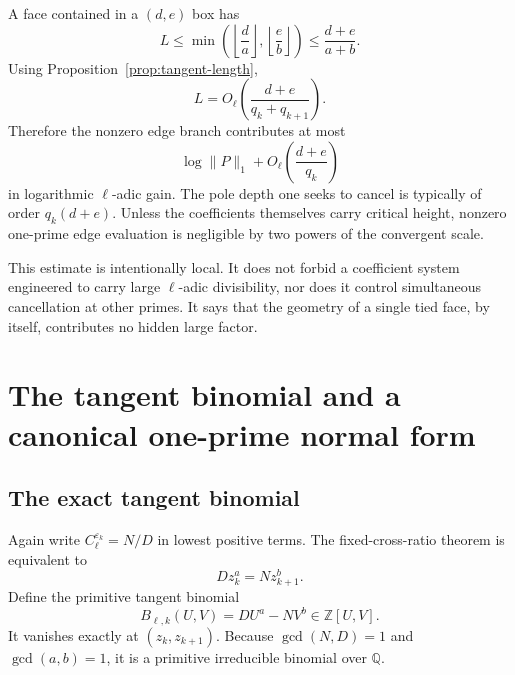 \documentclass[11pt,oneside]{article}
\theoremstyle{definition}
\theoremstyle{remark}
\newcommand{\Z}{\mathbb Z}
\newcommand{\Q}{\mathbb Q}
\newcommand{\eps}{\varepsilon}
\begin{document}
A face contained in a $(d,e)$ box has
\begin{equation}
 L\le\min\left(\left\lfloor\frac d a\right\rfloor,
               \left\lfloor\frac e b\right\rfloor\right)
 \le\frac{d+e}{a+b}.
 \label{eq:edge-length-bound}
\end{equation}
Using Proposition~\ref{prop:tangent-length},
\begin{equation}
 L=O_\ell\!\left(\frac{d+e}{q_k+q_{k+1}}\right).
 \label{eq:L-asymp}
\end{equation}
Therefore the nonzero edge branch contributes at most
\begin{equation}
 \log\lVert P\rVert_1
 +O_\ell\!\left(\frac{d+e}{q_k}\right)
 \label{eq:edge-small-gain}
\end{equation}
in logarithmic $\ell$-adic gain.  The pole depth one seeks to cancel is typically of order
$q_k(d+e)$.  Unless the coefficients themselves carry critical height, nonzero one-prime
edge evaluation is negligible by two powers of the convergent scale.

This estimate is intentionally local.  It does not forbid a coefficient system engineered to
carry large $\ell$-adic divisibility, nor does it control simultaneous cancellation at other
primes.  It says that the geometry of a single tied face, by itself, contributes no hidden
large factor.

\section{The tangent binomial and a canonical one-prime normal form}
\label{sec:normalform}

\subsection{The exact tangent binomial}

Again write $C_\ell^{\eps_k}=N/D$ in lowest positive terms.  The fixed-cross-ratio theorem is
equivalent to
\begin{equation}
 D z_k^a=N z_{k+1}^b.
 \label{eq:tangent-relation}
\end{equation}
Define the primitive tangent binomial
\begin{equation}
 B_{\ell,k}(U,V)=DU^a-NV^b\in\Z[U,V].
 \label{eq:tangent-binomial}
\end{equation}
It vanishes exactly at $(z_k,z_{k+1})$.  Because $\gcd(N,D)=1$ and $\gcd(a,b)=1$, it is a
primitive irreducible binomial over $\Q$.
\end{document}
